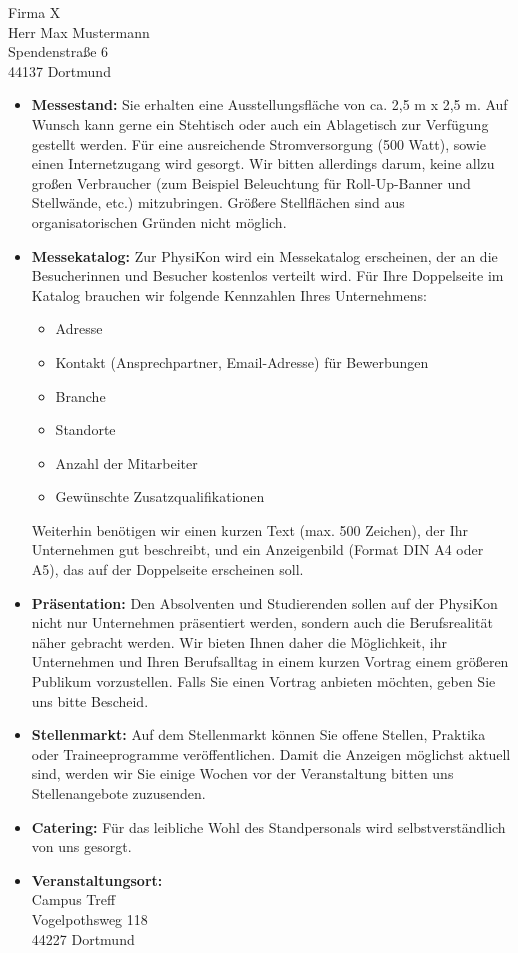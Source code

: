 \documentclass[
  pepbrief,
  fontsize=12pt,
  paper=a4,
  DIV=14,
  parskip=half,
  backaddress=false,
]{scrlttr2}
\begin{document}
\begin{letter}{%
  Firma X\\
  Herr Max Mustermann\\
  Spendenstraße 6\\
  44137 Dortmund%
}
\begin{itemize}
  \item \textbf{Messestand:} Sie erhalten eine Ausstellungsfläche von ca. 2,5 m x 2,5 m.
    Auf Wunsch kann gerne ein Stehtisch oder auch ein Ablagetisch zur Verfügung gestellt werden.
    Für eine ausreichende Stromversorgung (500 Watt), sowie einen Internetzugang wird gesorgt.
    Wir bitten allerdings darum, keine allzu großen Verbraucher (zum Beispiel Beleuchtung für Roll-Up-Banner und Stellwände, etc.) mitzubringen.
    Größere Stellflächen sind aus organisatorischen Gründen nicht möglich.
    \item \textbf{Messekatalog:} Zur PhysiKon wird ein Messekatalog erscheinen, der an die Besucherinnen und Besucher kostenlos verteilt wird.
    Für Ihre Doppelseite im Katalog brauchen wir folgende Kennzahlen Ihres Unternehmens:
    \begin{itemize}
      \item Adresse
      \item Kontakt (Ansprechpartner, Email-Adresse) für Bewerbungen
      \item Branche
      \item Standorte
      \item Anzahl der Mitarbeiter
      \item Gewünschte Zusatzqualifikationen
    \end{itemize}
    Weiterhin benötigen wir einen kurzen Text (max. 500 Zeichen), der Ihr Unternehmen gut beschreibt, und ein Anzeigenbild (Format DIN A4 oder A5), das auf der Doppelseite erscheinen soll.
    \item \textbf{Präsentation:} Den Absolventen und Studierenden sollen auf der PhysiKon nicht nur Unternehmen präsentiert werden, sondern auch die Berufsrealität näher gebracht werden.
    Wir bieten Ihnen daher die Möglichkeit, ihr Unternehmen und Ihren Berufsalltag in einem kurzen Vortrag einem größeren Publikum vorzustellen.
    Falls Sie einen Vortrag anbieten möchten, geben Sie uns bitte Bescheid.
    \item \textbf{Stellenmarkt:} Auf dem Stellenmarkt können Sie offene Stellen, Praktika oder Traineeprogramme veröffentlichen. Damit die Anzeigen möglichst aktuell sind,
    werden wir Sie einige Wochen vor der Veranstaltung bitten uns Stellenangebote zuzusenden.
    \item \textbf{Catering:} Für das leibliche Wohl des Standpersonals wird selbstverständlich von uns gesorgt.
    \item \textbf{Veranstaltungsort:}
    \vspace{3mm}\\
    Campus Treff\\
    Vogelpothsweg 118\\
    44227 Dortmund
\end{itemize}


\end{letter}
\end{document}

